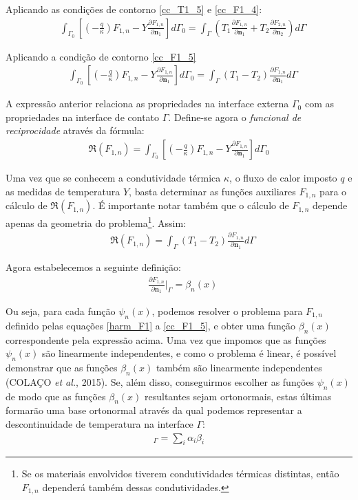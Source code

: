 Aplicando as condições de contorno \eqref{cc_T1_5} e \eqref{cc_F1_4}:
\begin{align}
	&
	\int_{\Gamma_0}\left[\left(-\frac{q}{\kappa}\right)F_{1,n} - Y\frac{\partial F_{1,n}}{\partial\mathbf{n}_1}\right]d\Gamma_0
	=
	\int_{\Gamma}\left(T_1\frac{\partial F_{1,n}}{\partial\mathbf{n}_1} + T_2\frac{\partial F_{2,n}}{\partial\mathbf{n}_2} \right)d\Gamma	
\end{align}

Aplicando a condição de contorno \eqref{cc_F1_5}
\begin{align}
	&
	\int_{\Gamma_0}\left[\left(-\frac{q}{\kappa}\right)F_{1,n} - Y\frac{\partial F_{1,n}}{\partial\mathbf{n}_1}\right]d\Gamma_0
	=
	\int_{\Gamma}(T_1 - T_2)\frac{\partial F_{1,n}}{\partial\mathbf{n}_1}d\Gamma \label{green_6}
\end{align}

A expressão anterior relaciona as propriedades na interface externa $\Gamma_0$ com as propriedades na interface de contato $\Gamma$. Define-se
agora o \textit{funcional de reciprocidade} através da fórmula:
\begin{align}
	\Re(F_{1,n}) = \int_{\Gamma_0}\left[\left(-\frac{q}{\kappa}\right)F_{1,n} - Y\frac{\partial F_{1,n}}{\partial\mathbf{n}_1}\right]d\Gamma_0
	\label{recipr_F}
\end{align}

Uma vez que se conhecem a condutividade térmica $\kappa$, o fluxo de calor imposto $q$ e as medidas de temperatura $Y$, basta determinar as
funções auxiliares $F_{1,n}$ para o cálculo de $\Re(F_{1,n})$. É importante notar também que o cálculo de $F_{1,n}$ depende apenas da geometria do
problema\footnote{Se os materiais envolvidos tiverem condutividades térmicas distintas, então $F_{1,n}$ dependerá também dessas condutividades.}.
Assim:
\begin{align}
	&
	\Re(F_{1,n})
	=
	\int_{\Gamma}(T_1 - T_2)\frac{\partial F_{1,n}}{\partial\mathbf{n}_1}d\Gamma \label{recipr_Fa}
\end{align}

Agora estabelecemos a seguinte definição:
\begin{align}
	& \frac{\partial F_{1,n}}{\partial\mathbf{n}_1}\Bigg|_\Gamma = \beta_n(x) \label{def_00}
\end{align}

Ou seja, para cada função $\psi_n(x)$, podemos resolver o problema para $F_{1,n}$ definido pelas equações \eqref{harm_F1} a \eqref{cc_F1_5}, e obter
uma função $\beta_n(x)$ correspondente pela expressão acima. Uma vez que impomos que as funções $\psi_n(x)$ são linearmente independentes, e
como o problema é linear, é possível demonstrar que as funções $\beta_n(x)$ também são linearmente independentes (COLAÇO \textit{et al.}, 2015). %
Se, além disso, conseguirmos
escolher as funções $\psi_n(x)$ de modo que as funções $\beta_n(x)$ resultantes sejam ortonormais, estas últimas formarão uma base ortonormal
através da qual podemos representar a descontinuidade de temperatura na interface $\Gamma$:
\begin{align}
	[T_1 - T_2]_\Gamma = \sum_i \alpha_i \beta_i\label{green_7a}
\end{align}

